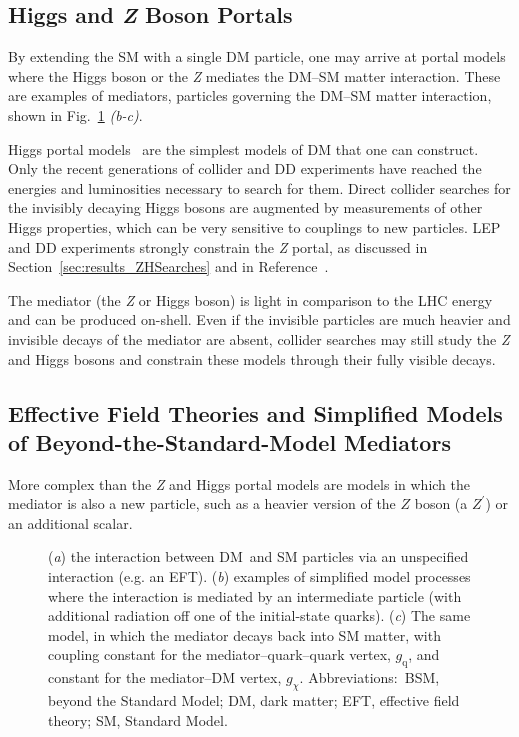 \documentclass{ar-1col}
\newcommand{\chiDM}{\ensuremath{\chi}\xspace}
\newcommand{\IP}{invisible particle}
\newcommand{\gDM}{\ensuremath{g_{\chiDM}}\xspace}
\newcommand{\gdm}{\gDM}
\newcommand{\gq}{$g_{\mathrm{q}}$\xspace}
\begin{document}
\subsection{Higgs and {\bf \it{Z}} Boson Portals}\label{sec:HZPortalModels}

By extending the SM with a single DM particle, one
may arrive at portal models where the Higgs boson or the \textit{Z} mediates
the DM--SM matter interaction. 
These are examples of {mediators}, particles governing the DM--SM
matter interaction, shown in Fig.~\ref{fig:feynman_0} \textit{(b-c)}.  

{Higgs portal} models~\cite{Patt:2006fw,Djouadi:2011aa} are
the simplest models of DM that one can construct. 
Only the recent generations of collider and DD
experiments have reached the energies and luminosities necessary to
search for them. Direct collider searches for the
invisibly decaying Higgs bosons are augmented by measurements of
other Higgs properties, which can be very sensitive to couplings
to new particles.
LEP and DD experiments strongly constrain the {\textit{Z} portal}, 
as discussed in
Section~\ref{sec:results_ZHSearches} and
in Reference~. 

The mediator (the \textit{Z} or Higgs boson) is light in
comparison to the LHC energy and can be produced on-shell. Even if
the {\IP}s are much heavier and invisible decays of the mediator
are absent, collider searches may still study the \textit{Z} and Higgs bosons and
constrain these models through their fully visible decays.

\subsection{Effective Field Theories and Simplified Models of Beyond-the-Standard-Model Mediators}\label{sec:BSMMediatorModels}

More complex than the \textit{Z} and Higgs portal
models are models in which the mediator is also a new particle, such
as a heavier version of the $Z$ boson (a $Z^\prime$) or an
additional scalar.

\begin{figure}[!htpb]
\caption{(\textit{a}) the interaction between DM\ and SM particles via an unspecified interaction (e.g. an EFT).
(\textit{b}) examples of simplified model processes where the interaction is mediated by an intermediate particle (with additional radiation off one of the initial-state quarks). 
(\textit{c}) The same model, in which  the mediator decays back into SM matter, with coupling constant for the mediator--quark--quark vertex, \gq, and constant for the mediator--DM vertex, \gdm. 
Abbreviations:\ BSM, beyond the Standard Model; DM, dark matter; EFT, effective field theory; SM, Standard Model. }
\label{fig:feynman_0}
\end{figure}
\end{document}
